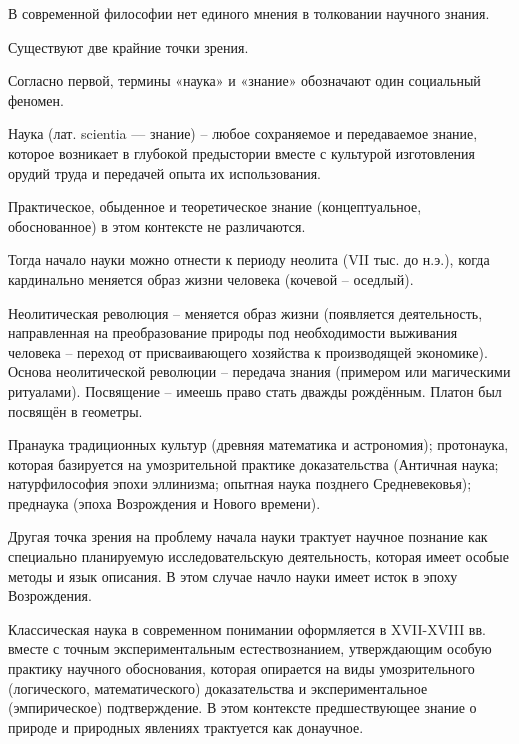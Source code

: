 \documentclass[exam_answers.tex]{subfiles}
\begin{document}
\renewcommand{\baselinestretch}{\blch}

В современной философии нет единого мнения в толковании научного знания.

Существуют две крайние точки зрения.

Согласно первой, термины «наука» и «знание» обозначают один социальный феномен.

Наука (лат. scientia — знание) – любое сохраняемое и передаваемое знание, которое возникает в глубокой предыстории вместе с культурой изготовления орудий труда и передачей опыта их использования.

Практическое, обыденное и теоретическое знание (концептуальное, обоснованное) в этом контексте не различаются.

Тогда начало науки можно отнести к периоду неолита (VII тыс. до н.э.), когда кардинально меняется образ жизни человека (кочевой – оседлый).

Неолитическая революция – меняется образ жизни (появляется деятельность, направленная на преобразование природы под необходимости выживания человека – переход от присваивающего хозяйства к производящей экономике).
Основа неолитической революции – передача знания (примером или магическими ритуалами).
Посвящение – имеешь право стать дважды рождённым.
Платон был посвящён в геометры.

Пранаука традиционных культур (древняя математика и астрономия);
протонаука, которая базируется на умозрительной практике доказательства (Античная наука; натурфилософия эпохи эллинизма;
опытная наука позднего Средневековья);
преднаука (эпоха Возрождения и Нового времени).

Другая точка зрения на проблему начала науки трактует научное познание как специально планируемую исследовательскую деятельность, которая имеет особые методы и язык описания.
В этом случае начло науки имеет исток в эпоху Возрождения.

Классическая наука в современном понимании оформляется в XVII-XVIII вв. вместе с точным экспериментальным естествознанием, утверждающим особую практику научного обоснования, которая опирается на виды умозрительного (логического, математического) доказательства и экспериментальное (эмпирическое) подтверждение.
В этом контексте предшествующее знание о природе и природных явлениях трактуется как донаучное.
\end{document}
